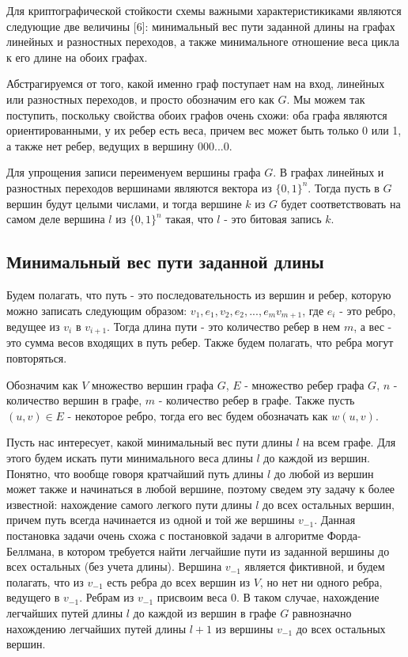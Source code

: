 \documentclass[a4paper,12pt]{extarticle}
\theoremstyle{plain} %
\begin{document}
\begin{large}
Для криптографической стойкости схемы важными характеристикиками являются следующие две величины [6]: минимальный вес пути заданной длины на графах линейных и разностных переходов, а также минимальноге отношение веса цикла к его длине на обоих графах.

Абстрагируемся от того, какой именно граф поступает нам на вход, линейных или разностных переходов, и просто обозначим его как $G$. Мы можем так поступить, поскольку свойства обоих графов очень схожи: оба графа являются ориентированными, у их ребер есть веса, причем вес может быть только 0 или 1, а также нет ребер, ведущих в вершину 000...0.

Для упрощения записи переименуем вершины графа $G$. В графах линейных и разностных переходов вершинами являются вектора из $\{0, 1\}^n$. Тогда пусть в $G$ вершин будут целыми числами, и тогда вершине $k$ из $G$ будет соответствовать на самом деле вершина $l$ из $\{0, 1\}^n$ такая, что $l$ - это битовая запись $k$.

\subsection{Минимальный вес пути заданной длины}

Будем полагать, что путь - это последовательность из вершин и ребер, которую можно записать следующим образом: $v_1, e_1, v_2, e_2, ..., e_mv_{m+1}$, где $e_i$ - это ребро, ведущее из $v_i$ в $v_{i+1}$. Тогда длина пути - это количество ребер в нем $m$, а вес - это сумма весов входящих в путь ребер. Также будем полагать, что ребра могут повторяться.

Обозначим как $V$ множество вершин графа $G$, $E$ - множество ребер графа $G$, $n$ - количество вершин в графе, $m$ - количество ребер в графе. Также пусть $(u, v) \in E$ - некоторое ребро, тогда его вес будем обозначать как $w(u, v)$.

Пусть нас интересует, какой минимальный вес пути длины $l$ на всем графе. Для этого будем искать пути минимального веса длины $l$ до каждой из вершин. Понятно, что вообще говоря кратчайший путь длины $l$ до любой из вершин может также и начинаться в любой вершине, поэтому сведем эту задачу к более известной: нахождение самого легкого пути длины $l$ до всех остальных вершин, причем путь всегда начинается из одной и той же вершины $v_{-1}$. Данная постановка задачи очень схожа с постановкой задачи в алгоритме Форда-Беллмана, в котором требуется найти легчайшие пути из заданной вершины до всех остальных (без учета длины). Вершина $v_{-1}$ является фиктивной, и будем полагать, что из $v_{-1}$ есть ребра до всех вершин из $V$, но нет ни одного ребра, ведущего в $v_{-1}$. Ребрам из $v_{-1}$ присвоим веса 0. В таком случае, нахождение легчайших путей длины $l$ до каждой из вершин в графе $G$ равнозначно нахождению легчайших путей длины $l+1$ из вершины $v_{-1}$ до всех остальных вершин.


\end{large}
\end{document}
